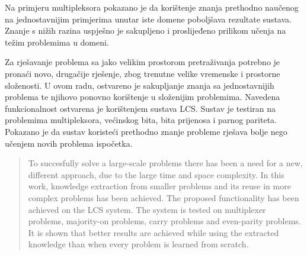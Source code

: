 \documentclass[times, utf8, zavrsni]{fer}
\begin{document}
Na primjeru multipleksora pokazano je da korištenje znanja prethodno naučenog na jednostavnijim primjerima unutar iste domene poboljšava rezultate sustava.
Znanje s nižih razina uspješno je sakupljeno i proslijeđeno prilikom učenja na težim problemima u domeni.




\begin{sazetak}
Za rješavanje problema sa jako velikim prostorom pretraživanja potrebno je pronaći novo, drugačije rješenje, zbog trenutne velike vremenske i prostorne složenosti.
U ovom radu, ostvareno je sakupljanje znanja sa jednostavnijih problema te njihovo ponovno korištenje u složenijim problemima.
Navedena funkcionalnost ostvarena je korištenjem sustava LCS.
Sustav je testiran na problemima multipleksora, većinskog bita, bita prijenosa i parnog pariteta.
Pokazano je da sustav koristeći prethodno znanje probleme rješava bolje nego učenjem novih problema ispočetka.

\end{sazetak}

\begin{abstract}
To succesfully solve a large-scale problems there has been a need for a new, different approach, due to the large time and space complexity.
In this work, knowledge extraction from smaller problems and its reuse in more complex problems has been achieved.
The proposed functionality has been achieved on the LCS system.
The system is tested on multiplexer problems, majority-on problems, carry problems and even-parity problems.
It is shown that better results are achieved while using the extracted knowledge than when every problem is learned from scratch.


\end{abstract}
\end{document}
